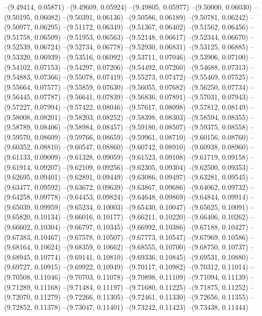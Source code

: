 --(9.49414, 0.05871)
--(9.49609, 0.05924)
--(9.49805, 0.05977)
--(9.50000, 0.06030)
--(9.50195, 0.06082)
--(9.50391, 0.06136)
--(9.50586, 0.06189)
--(9.50781, 0.06242)
--(9.50977, 0.06295)
--(9.51172, 0.06349)
--(9.51367, 0.06402)
--(9.51562, 0.06456)
--(9.51758, 0.06509)
--(9.51953, 0.06563)
--(9.52148, 0.06617)
--(9.52344, 0.06670)
--(9.52539, 0.06724)
--(9.52734, 0.06778)
--(9.52930, 0.06831)
--(9.53125, 0.06885)
--(9.53320, 0.06939)
--(9.53516, 0.06992)
--(9.53711, 0.07046)
--(9.53906, 0.07100)
--(9.54102, 0.07153)
--(9.54297, 0.07206)
--(9.54492, 0.07260)
--(9.54688, 0.07313)
--(9.54883, 0.07366)
--(9.55078, 0.07419)
--(9.55273, 0.07472)
--(9.55469, 0.07525)
--(9.55664, 0.07577)
--(9.55859, 0.07630)
--(9.56055, 0.07682)
--(9.56250, 0.07734)
--(9.56445, 0.07787)
--(9.56641, 0.07839)
--(9.56836, 0.07891)
--(9.57031, 0.07943)
--(9.57227, 0.07994)
--(9.57422, 0.08046)
--(9.57617, 0.08098)
--(9.57812, 0.08149)
--(9.58008, 0.08201)
--(9.58203, 0.08252)
--(9.58398, 0.08303)
--(9.58594, 0.08355)
--(9.58789, 0.08406)
--(9.58984, 0.08457)
--(9.59180, 0.08507)
--(9.59375, 0.08558)
--(9.59570, 0.08609)
--(9.59766, 0.08659)
--(9.59961, 0.08710)
--(9.60156, 0.08760)
--(9.60352, 0.08810)
--(9.60547, 0.08860)
--(9.60742, 0.08910)
--(9.60938, 0.08960)
--(9.61133, 0.09009)
--(9.61328, 0.09059)
--(9.61523, 0.09108)
--(9.61719, 0.09158)
--(9.61914, 0.09207)
--(9.62109, 0.09256)
--(9.62305, 0.09304)
--(9.62500, 0.09353)
--(9.62695, 0.09401)
--(9.62891, 0.09449)
--(9.63086, 0.09497)
--(9.63281, 0.09545)
--(9.63477, 0.09592)
--(9.63672, 0.09639)
--(9.63867, 0.09686)
--(9.64062, 0.09732)
--(9.64258, 0.09778)
--(9.64453, 0.09824)
--(9.64648, 0.09869)
--(9.64844, 0.09914)
--(9.65039, 0.09959)
--(9.65234, 0.10003)
--(9.65430, 0.10047)
--(9.65625, 0.10091)
--(9.65820, 0.10134)
--(9.66016, 0.10177)
--(9.66211, 0.10220)
--(9.66406, 0.10262)
--(9.66602, 0.10304)
--(9.66797, 0.10345)
--(9.66992, 0.10386)
--(9.67188, 0.10427)
--(9.67383, 0.10467)
--(9.67578, 0.10507)
--(9.67773, 0.10547)
--(9.67969, 0.10586)
--(9.68164, 0.10624)
--(9.68359, 0.10662)
--(9.68555, 0.10700)
--(9.68750, 0.10737)
--(9.68945, 0.10774)
--(9.69141, 0.10810)
--(9.69336, 0.10845)
--(9.69531, 0.10880)
--(9.69727, 0.10915)
--(9.69922, 0.10949)
--(9.70117, 0.10982)
--(9.70312, 0.11014)
--(9.70508, 0.11046)
--(9.70703, 0.11078)
--(9.70898, 0.11109)
--(9.71094, 0.11139)
--(9.71289, 0.11168)
--(9.71484, 0.11197)
--(9.71680, 0.11225)
--(9.71875, 0.11252)
--(9.72070, 0.11279)
--(9.72266, 0.11305)
--(9.72461, 0.11330)
--(9.72656, 0.11355)
--(9.72852, 0.11378)
--(9.73047, 0.11401)
--(9.73242, 0.11423)
--(9.73438, 0.11444)
